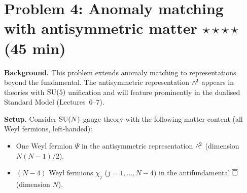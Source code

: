 \documentclass[11pt,a4paper]{article}
\begin{document}
\newpage

\section*{Problem 4: Anomaly matching with antisymmetric matter
  \hfill $\star\star\star\star$ \normalsize(45 min)}
\label{prob:antisymmetric}

\noindent\textbf{Background.}
This problem extends anomaly matching to representations beyond the
fundamental.  The antisymmetric representation $\wedge^{\!2}$ appears in
theories with $\mathrm{SU}(5)$ unification and will feature prominently in the
dualised Standard Model (Lectures~6--7).

\medskip
\noindent\textbf{Setup.}
Consider $\mathrm{SU}(N)$ gauge theory with the following matter content (all
Weyl fermions, left-handed):
\begin{itemize}
  \item One Weyl fermion $\Psi$ in the antisymmetric representation
    $\wedge^{\!2}$ (dimension $N(N-1)/2$).
  \item $(N-4)$ Weyl fermions $\chi_j$ ($j = 1,\ldots,N-4$) in the
    antifundamental $\overline{\square}$ (dimension $N$).
\end{itemize}
\end{document}
